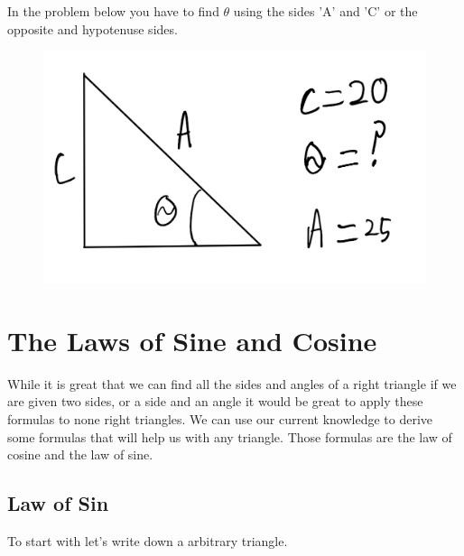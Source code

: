 \documentclass[12pt]{article}
\begin{document}
\parbox[][13cm][t]{8cm}{}


In the problem below you have to find $\theta$ using the sides 'A' and 'C' or the opposite and hypotenuse sides.
\begin{figure}[h]
\includegraphics[scale=0.25]{TrigInverseProb3.png}
\end{figure}

\parbox[][8cm][t]{8cm}{}

\section{The Laws of Sine and Cosine}
While it is great that we can find all the sides and angles of a right triangle if we are given two sides, or a side and an angle it would be great to apply these formulas to none right triangles. We can use our current knowledge to derive some formulas that will help us with any triangle. Those formulas are the law of cosine and the law of sine.

\subsection{Law of Sin}
To start with let's write down a arbitrary triangle.
\end{document}
